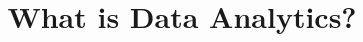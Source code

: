 \documentclass[xcolor=dvipsnames,compress,t,pdf,9pt]{beamer}
\title[\insertframenumber /\inserttotalframenumber]{What is Data Analytics?}
\begin{document}
	\begin{frame}
	\titlepage
	\end{frame}

	
	
\end{document}
